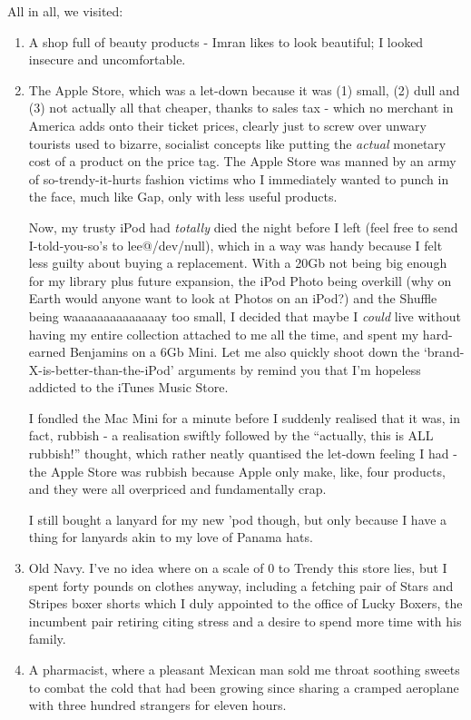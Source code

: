 \documentclass[a5paper,titlepage,draft]{book}
\begin{document}
All in all, we visited:
\begin{enumerate}
\item A shop full of beauty products - Imran likes to look beautiful; I looked insecure and uncomfortable.
\item The Apple Store, which was a let-down because it was (1) small, (2) dull and (3) not actually all that cheaper, thanks to sales tax - which no merchant in America adds onto their ticket prices, clearly just to screw over unwary tourists used to bizarre, socialist concepts like putting the \emph{actual} monetary cost of a product on the price tag.  The Apple Store was manned by an army of so-trendy-it-hurts fashion victims who I immediately wanted to punch in the face, much like Gap, only with less useful products.

Now, my trusty iPod had \emph{totally} died the night before I left (feel free to send I-told-you-so's to lee@/dev/null), which in a way was handy because I felt less guilty about buying a replacement.  With a 20Gb not being big enough for my library plus future expansion, the iPod Photo being overkill (why on Earth would anyone want to look at Photos on an iPod?) and the Shuffle being waaaaaaaaaaaaaay too small, I decided that maybe I \emph{could} live without having my entire collection attached to me all the time, and spent my hard-earned Benjamins on a 6Gb Mini.  Let me also quickly shoot down the `brand-X-is-better-than-the-iPod' arguments by remind you that I'm hopeless addicted to the iTunes Music Store.

I fondled the Mac Mini for a minute before I suddenly realised that it was, in fact, rubbish - a realisation swiftly followed by the ``actually, this is ALL rubbish!'' thought, which rather neatly quantised the let-down feeling I had - the Apple Store was rubbish because Apple only make, like, four products, and they were all overpriced and fundamentally crap.

I still bought a lanyard for my new 'pod though, but only because I have a thing for lanyards akin to my love of Panama hats. 

\item Old Navy.  I've no idea where on a scale of 0 to Trendy this store lies, but I spent forty pounds on clothes anyway, including a fetching pair of Stars and Stripes boxer shorts which I duly appointed to the office of Lucky Boxers, the incumbent pair retiring citing stress and a desire to spend more time with his family.

\item A pharmacist, where a pleasant Mexican man sold me throat soothing sweets to combat the cold that had been growing since sharing a cramped aeroplane with three hundred strangers for eleven hours.


\end{enumerate}
\end{document}
